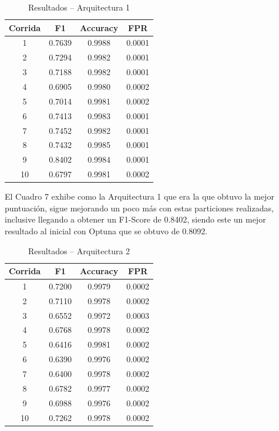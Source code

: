 \documentclass[12pt,a4paper]{article}
\begin{document}
\begin{table}[H]
  \centering
  \begin{tabular}{c c c c}
    \hline
    Corrida & F1 & Accuracy & FPR \\
    \hline
    1  & 0.7639 & 0.9988 & 0.0001 \\
    2  & 0.7294 & 0.9982 & 0.0001 \\
    3  & 0.7188 & 0.9982 & 0.0001 \\
    4  & 0.6905 & 0.9980 & 0.0002 \\
    5  & 0.7014 & 0.9981 & 0.0002 \\
    6  & 0.7413 & 0.9983 & 0.0001 \\
    7  & 0.7452 & 0.9982 & 0.0001 \\
    8  & 0.7432 & 0.9985 & 0.0001 \\
    9  & 0.8402 & 0.9984 & 0.0001 \\
    10 & 0.6797 & 0.9981 & 0.0002 \\
    \hline
  \end{tabular}
  \caption{Resultados – Arquitectura 1}
  \label{tab:corridas_arq1}
\end{table}

El Cuadro 7 exhibe como la Arquitectura 1 que era la que obtuvo la mejor puntuación, sigue mejorando un poco
más con estas particiones realizadas, inclusive llegando a obtener un F1-Score de 0.8402, siendo este un mejor resultado
al inicial con Optuna que se obtuvo de 0.8092.

\begin{table}[H]
  \centering
  \begin{tabular}{c c c c}
    \hline
    Corrida & F1 & Accuracy & FPR \\
    \hline
    1  & 0.7200 & 0.9979 & 0.0002 \\
    2  & 0.7110 & 0.9978 & 0.0002 \\
    3  & 0.6552 & 0.9972 & 0.0003 \\
    4  & 0.6768 & 0.9978 & 0.0002 \\
    5  & 0.6416 & 0.9981 & 0.0002 \\
    6  & 0.6390 & 0.9976 & 0.0002 \\
    7  & 0.6400 & 0.9978 & 0.0002 \\
    8  & 0.6782 & 0.9977 & 0.0002 \\
    9  & 0.6988 & 0.9976 & 0.0002 \\
    10 & 0.7262 & 0.9978 & 0.0002 \\
    \hline
  \end{tabular}
  \caption{Resultados – Arquitectura 2}
  \label{tab:corridas_arq2}
\end{table}
\end{document}

